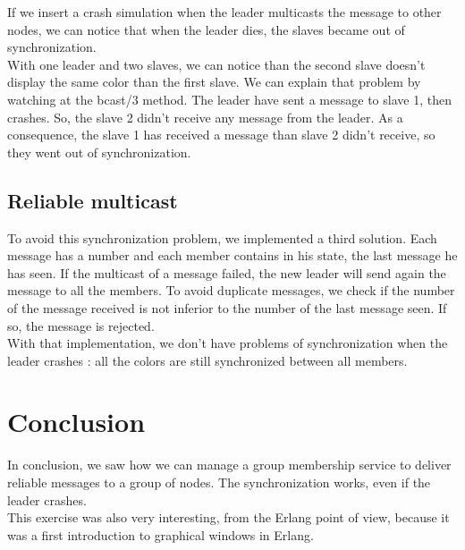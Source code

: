 \documentclass[a4paper, 11pt]{article}
\begin{document}
If we insert a crash simulation when the leader multicasts the message to other nodes, we can notice that when the leader dies, the slaves became out of synchronization.\\
With one leader and two slaves, we can notice than the second slave doesn't display the same color than the first slave. We can explain that problem by watching at the bcast/3 method. The leader have sent a message to slave 1, then crashes. So, the slave 2 didn't receive any message from the leader. As a consequence, the slave 1 has received a message than slave 2 didn't receive, so they went out of synchronization.

\subsection{Reliable multicast}
To avoid this synchronization problem, we implemented a third solution. Each message has a number and each member contains in his state, the last message he has seen. If the multicast of a message failed, the new leader will send again the message to all the members. To avoid duplicate messages, we check if the number of the message received is not inferior to the number of the last message seen. If so, the message is rejected.\\

With that implementation, we don't have problems of synchronization when the leader crashes : all the colors are still synchronized between all members.

\section{Conclusion}
In conclusion, we saw how we can manage a group membership service to deliver reliable messages to a group of nodes. The synchronization works, even if the leader crashes.\\
This exercise was also very interesting, from the Erlang point of view, because it was a first introduction to graphical windows in Erlang.
\end{document}
